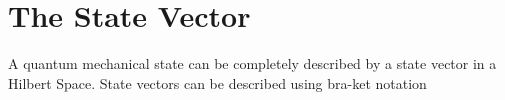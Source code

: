 
\section{The State Vector}
\label{sec:state-vector}

A quantum mechanical state can be completely described by a state
vector in a Hilbert Space. State vectors can be described using
bra-ket notation




